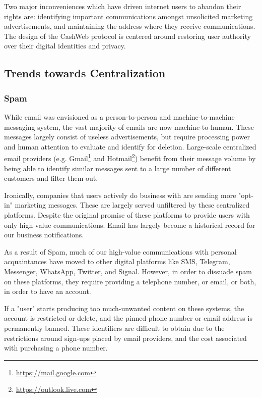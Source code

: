 \documentclass{article}
\begin{document}
Two major inconveniences which have driven internet users to abandon their rights are: identifying important communications amongst unsolicited marketing advertisements, and maintaining the address where they receive communications. The design of the CashWeb protocol is centered around restoring user authority over their digital identities and privacy.

\subsection{Trends towards Centralization}


\subsubsection{Spam}

While email was envisioned as a person-to-person and machine-to-machine messaging system, the vast majority of emails are now machine-to-human. These messages largely consist of useless advertisements, but require processing power and human attention to evaluate and identify for deletion. Large-scale centralized email providers (e.g. Gmail\footnote{\url{https://mail.google.com}} and Hotmail\footnote{\url{https://outlook.live.com}}) benefit from their message volume by being able to identify similar messages sent to a large number of different customers and filter them out.

Ironically, companies that users actively do business with are sending more "opt-in" marketing messages. These are largely served unfiltered by these centralized platforms. Despite the original promise of these platforms to provide users with only high-value communications. Email has largely become a historical record for our business notifications.

As a result of Spam, much of our high-value communications with personal acquaintances have moved to other digital platforms like SMS, Telegram, Messenger, WhatsApp, Twitter, and Signal. However, in order to dissuade spam on these platforms, they require providing a telephone number, or email, or both, in order to have an account.

If a "user" starts producing too much-unwanted content on these systems, the account is restricted or delete, and the pinned phone number or email address is permanently banned. These identifiers are difficult to obtain due to the restrictions around sign-ups placed by email providers, and the cost associated with purchasing a phone number.
\end{document}
